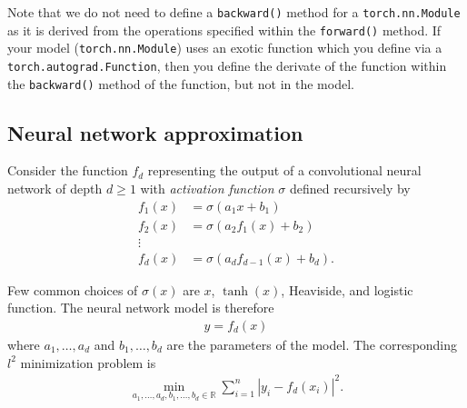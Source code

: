 \documentclass[
]{article}
\newcommand{\1}{\boldsymbol{1}}
\begin{document}
Note that we do not need to define a \texttt{backward()} method for a
\texttt{torch.nn.Module} as it is derived from the operations specified
within the \texttt{forward()} method. If your model
(\texttt{torch.nn.Module}) uses an exotic function which you define via
a \texttt{torch.autograd.Function}, then you define the derivate of the
function within the \texttt{backward()} method of the function, but not
in the model.

\hypertarget{neural-network-approximation}{%
\subsection{Neural network
approximation}\label{neural-network-approximation}}

Consider the function \(f_d\) representing the output of a convolutional
neural network of depth \(d \ge 1\) with \emph{activation function}
\(\sigma\) defined recursively by \begin{align*}
    f_1(x) &= \sigma(a_1 x + b_1)
    \\
    f_2(x) &= \sigma(a_2 f_1(x) + b_2)
    \\
    \vdots
    \\
    f_d(x) &= \sigma(a_d f_{d-1}(x) + b_d).
\end{align*}

Few common choices of \(\sigma(x)\) are \(x\), \(\tanh(x)\), Heaviside,
and logistic function. The neural network model is therefore
\begin{align*}
    y = f_d(x)
\end{align*} where \(a_1, \dots, a_d\) and \(b_1, \dots, b_d\) are the
parameters of the model. The corresponding \(l^2\) minimization problem
is \begin{align*}
    \min_{a_1, \dots, a_d, b_1, \dots, b_d \in \mathbb{R}} \sum_{i=1}^{n} \left\lvert y_i - f_d(x_i)\right\rvert^2.
\end{align*}
\end{document}
